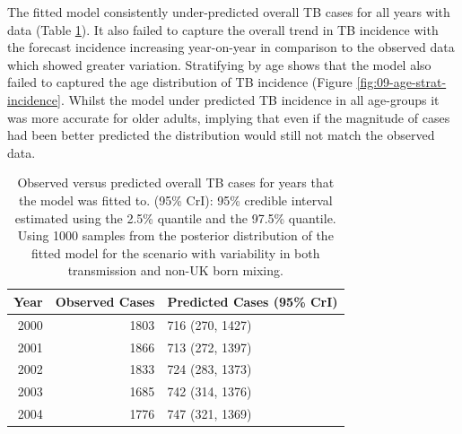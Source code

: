 \documentclass[11pt,twoside]{bristolthesis}
\begin{document}
  The fitted model consistently under-predicted overall TB cases for all years with data (Table \ref{tab:09-table-incidence-preds}). It also failed to capture the overall trend in TB incidence with the forecast incidence increasing year-on-year in comparison to the observed data which showed greater variation. Stratifying by age shows that the model also failed to captured the age distribution of TB incidence (Figure \ref{fig:09-age-strat-incidence}. Whilst the model under predicted TB incidence in all age-groups it was more accurate for older adults, implying that even if the magnitude of cases had been better predicted the distribution would still not match the observed data.
  \begin{longtable}{rrl}
  \caption[Observed versus predicted overall TB cases for years that the model was fitted to.]{\label{tab:09-table-incidence-preds}Observed versus predicted overall TB cases for years that the model was fitted to. (95\% CrI): 95\% credible interval estimated using the 2.5\% quantile and the 97.5\% quantile. Using 1000 samples from the posterior distribution of the fitted model for the scenario with variability in both transmission and non-UK born mixing.}\\
  \toprule
  Year & Observed Cases & Predicted Cases (95\% CrI)\\
  \midrule
  2000 & 1803 & 716 (270, 1427)\\
  2001 & 1866 & 713 (272, 1397)\\
  2002 & 1833 & 724 (283, 1373)\\
  2003 & 1685 & 742 (314, 1376)\\
  2004 & 1776 & 747 (321, 1369)\\
  \bottomrule
  \end{longtable}
\end{document}
